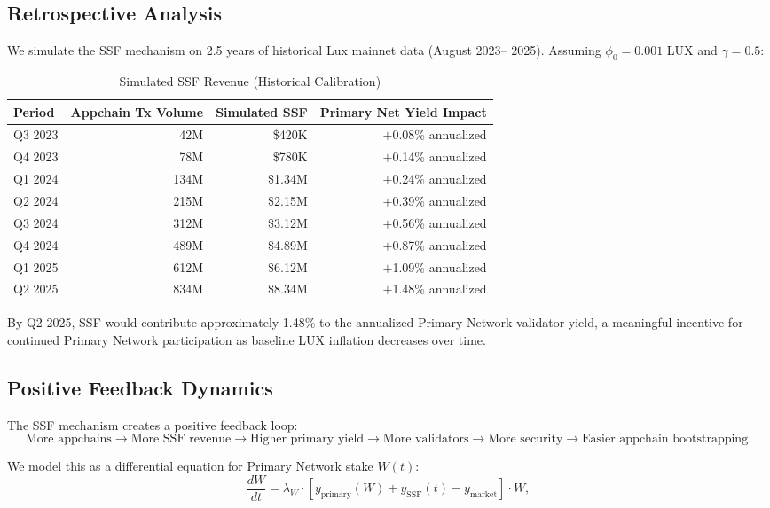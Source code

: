 \documentclass[11pt]{article}
\begin{document}
\subsection{Retrospective Analysis}

We simulate the SSF mechanism on 2.5 years of historical Lux mainnet data (August 2023--
2025). Assuming $\phi_0 = 0.001$ LUX and $\gamma = 0.5$:

\begin{table}[H]
\centering
\caption{Simulated SSF Revenue (Historical Calibration)}
\label{tab:ssf}
\begin{tabular}{lrrr}
\toprule
\textbf{Period} & \textbf{Appchain Tx Volume} & \textbf{Simulated SSF} & \textbf{Primary Net Yield Impact} \\
\midrule
Q3 2023 & 42M & \$420K & $+$0.08\% annualized \\
Q4 2023 & 78M & \$780K & $+$0.14\% annualized \\
Q1 2024 & 134M & \$1.34M & $+$0.24\% annualized \\
Q2 2024 & 215M & \$2.15M & $+$0.39\% annualized \\
Q3 2024 & 312M & \$3.12M & $+$0.56\% annualized \\
Q4 2024 & 489M & \$4.89M & $+$0.87\% annualized \\
Q1 2025 & 612M & \$6.12M & $+$1.09\% annualized \\
Q2 2025 & 834M & \$8.34M & $+$1.48\% annualized \\
\bottomrule
\end{tabular}
\end{table}

By Q2 2025, SSF would contribute approximately 1.48\% to the annualized Primary Network
validator yield, a meaningful incentive for continued Primary Network participation as
baseline LUX inflation decreases over time.

\subsection{Positive Feedback Dynamics}

The SSF mechanism creates a positive feedback loop:
\[
  \text{More appchains} \to \text{More SSF revenue} \to \text{Higher primary yield} \to
  \text{More validators} \to \text{More security} \to \text{Easier appchain bootstrapping}.
\]

We model this as a differential equation for Primary Network stake $W(t)$:
\begin{equation}
  \frac{dW}{dt} = \lambda_W \cdot \left[y_{\text{primary}}(W) + y_{\text{SSF}}(t) - y_{\text{market}}\right] \cdot W,
  \label{eq:stakeflow}
\end{equation}
\end{document}
